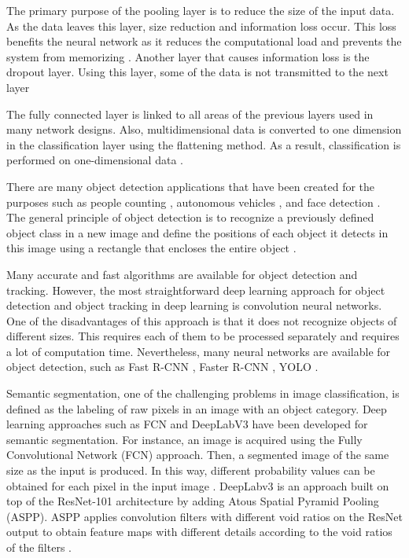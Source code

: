 The primary purpose of the pooling layer is to reduce the size of the input data. As the data leaves this layer, size reduction and information loss occur. This loss benefits the neural network as it reduces the computational load and prevents the system from memorizing \cite{goodfellow2016deep}. Another layer that causes information loss is the dropout layer. Using this layer, some of the data is not transmitted to the next layer


The fully connected layer is linked to all areas of the previous layers used in many network designs. Also, multidimensional data is converted to one dimension in the classification layer using the flattening method. As a result, classification is performed on one-dimensional data \cite{goodfellow2016deep}.

There are many object detection applications that have been created for the purposes such as people counting \cite{nogueira2019retailnet}, autonomous vehicles \cite{rausch2017learning}, and face detection \cite{yang2015facial}. The general principle of object detection is to recognize a previously defined object class in a new image and define the positions of each object it detects in this image using a rectangle that encloses the entire object \cite{goodfellow2016deep}.

Many accurate and fast algorithms are available for object detection and tracking. However, the most straightforward deep learning approach for object detection and object tracking in deep learning is convolution neural networks.  One of the disadvantages of this approach is that it does not recognize objects of different sizes. This requires each of them to be processed separately and requires a lot of computation time. Nevertheless, many neural networks are available for object detection, such as Fast R-CNN \cite{girshick2015fast}, Faster R-CNN \cite{ren2016faster}, YOLO \cite{redmon2018yolov3}.

Semantic segmentation, one of the challenging problems in image classification, is defined as the labeling of raw pixels in an image with an object category. Deep learning approaches such as FCN and DeepLabV3 have been developed for semantic segmentation. For instance, an image is acquired using the Fully Convolutional Network (FCN) approach. Then, a segmented image of the same size as the input is produced. In this way, different probability values can be obtained for each pixel in the input image \cite{long2015fully}. DeepLabv3 is an approach built on top of the ResNet-101 \cite{deepResidualLearning2016} architecture by adding Atous Spatial Pyramid Pooling (ASPP). ASPP applies convolution filters with different void ratios on the ResNet output to obtain feature maps with different details according to the void ratios of the filters \cite{chen2017rethinking}.